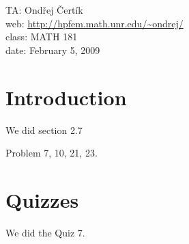 \documentclass[10pt]{article}
\begin{document}
\noindent TA: Ondřej Čertík\\
web: \url{http://hpfem.math.unr.edu/~ondrej/}\\
class: MATH 181\\
date: February 5, 2009

\section{Introduction}

We did section 2.7

Problem 7, 10, 21, 23.

\section{Quizzes}

We did the Quiz 7.
\end{document}
